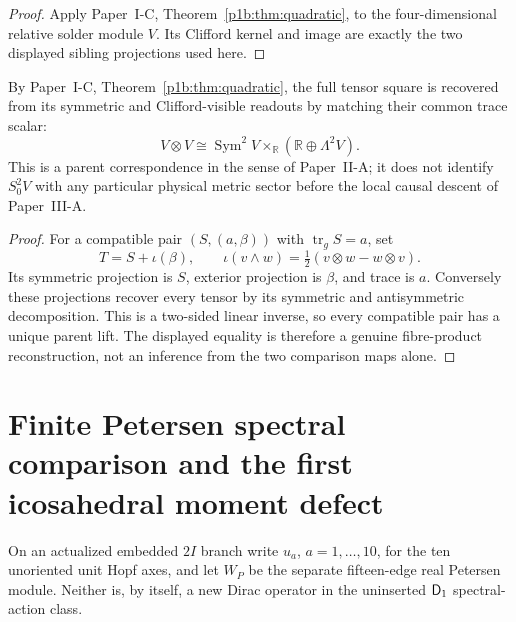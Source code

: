\documentclass[12pt,a4paper]{article}
\begin{document}
\begin{proof}
Apply Paper~I-C, Theorem~\ref{p1b:thm:quadratic}, to the four-dimensional
relative solder module \(V\).  Its Clifford kernel and image are exactly
the two displayed sibling projections used here.
\end{proof}

\begin{corollary}
\label{p3b:cor:v189-quadratic-fibre-product}
By Paper~I-C, Theorem~\ref{p1b:thm:quadratic}, the full tensor square is
recovered from its symmetric and Clifford-visible readouts by matching their
common trace scalar:
\[
 \boxed{V\otimes V\cong
 \operatorname{Sym}^2V\times_{\mathbb R}
 (\mathbb R\oplus\Lambda^2V).}
\]
This is a parent correspondence in the sense of Paper~II-A; it does not
identify $S^2_0V$ with any particular physical metric sector before the local
causal descent of Paper~III-A.
\end{corollary}
\begin{proof}
For a compatible pair $(S,(a,\beta))$ with $\operatorname{tr}_gS=a$, set
\[
 T=S+\iota(\beta),\qquad
 \iota(v\wedge w)=\tfrac12(v\otimes w-w\otimes v).
\]
Its symmetric projection is $S$, exterior projection is $\beta$, and trace
is $a$. Conversely these projections recover every tensor by its symmetric
and antisymmetric decomposition. This is a two-sided linear inverse, so
every compatible pair has a unique parent lift. The displayed equality is
therefore a genuine fibre-product reconstruction, not an inference from the
two comparison maps alone.
\end{proof}


\section{Finite Petersen spectral comparison and the first icosahedral moment defect}
\label{p3b:sec:v319-petersen-spectral}
On an actualized embedded $2I$ branch write $u_a$, $a=1,\ldots,10$,
for the ten unoriented unit Hopf axes, and let $W_P$ be the separate
fifteen-edge real Petersen module.  Neither is, by itself, a new
Dirac operator in the uninserted $\mathsf{D}_1$ spectral-action class.
\end{document}
